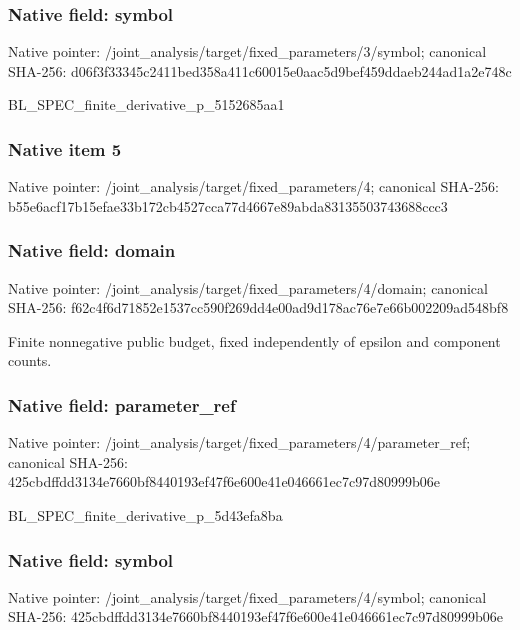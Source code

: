 \documentclass[10pt,a4paper]{article}
\begin{document}
\subsubsection{Native field: symbol}
Native pointer: /joint\_\allowbreak{}analysis/target/fixed\_\allowbreak{}parameters/3/symbol; canonical SHA-256: d06f3f33345c2411bed358a411c60015e0aac5d9bef459ddaeb244ad1a2e748c

\begingroup\raggedright\sloppy BL\_\allowbreak{}SPEC\_\allowbreak{}finite\_\allowbreak{}derivative\_\allowbreak{}p\_\allowbreak{}5152685aa1\par\endgroup

\subsubsection{Native item 5}
Native pointer: /joint\_\allowbreak{}analysis/target/fixed\_\allowbreak{}parameters/4; canonical SHA-256: b55e6acf17b15efae33b172cb4527cca77d4667e89abda83135503743688ccc3

\subsubsection{Native field: domain}
Native pointer: /joint\_\allowbreak{}analysis/target/fixed\_\allowbreak{}parameters/4/domain; canonical SHA-256: f62c4f6d71852e1537cc590f269dd4e00ad9d178ac76e7e66b002209ad548bf8

\begingroup\raggedright\sloppy Finite nonnegative public budget,\allowbreak{} fixed independently of epsilon and component counts.\par\endgroup

\subsubsection{Native field: parameter\_\allowbreak{}ref}
Native pointer: /joint\_\allowbreak{}analysis/target/fixed\_\allowbreak{}parameters/4/parameter\_\allowbreak{}ref; canonical SHA-256: 425cbdffdd3134e7660bf8440193ef47f6e600e41e046661ec7c97d80999b06e

\begingroup\raggedright\sloppy BL\_\allowbreak{}SPEC\_\allowbreak{}finite\_\allowbreak{}derivative\_\allowbreak{}p\_\allowbreak{}5d43efa8ba\par\endgroup

\subsubsection{Native field: symbol}
Native pointer: /joint\_\allowbreak{}analysis/target/fixed\_\allowbreak{}parameters/4/symbol; canonical SHA-256: 425cbdffdd3134e7660bf8440193ef47f6e600e41e046661ec7c97d80999b06e
\end{document}
